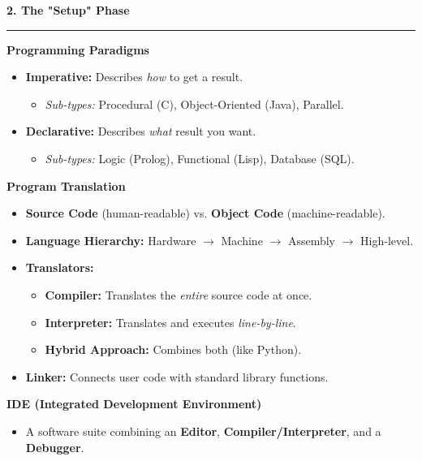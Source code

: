 \documentclass[a4paper, 8pt]{extarticle}
\newcommand{\sectionheading}[1]{\large\textbf{#1}\par\noindent\rule{\linewidth}{0.4pt}}
\newcommand{\subsectionheading}[1]{\normalsize\textbf{#1}}
\begin{document}
\begin{multicols}{2}
\vspace{1em}
\sectionheading{2. The "Setup" Phase}
\vspace{0.5em}
\subsectionheading{Programming Paradigms}
\begin{itemize}
    \item \textbf{Imperative:} Describes \textit{how} to get a result.
        \begin{itemize}
            \item \textit{Sub-types:} Procedural (C), Object-Oriented (Java), Parallel.
        \end{itemize}
    \item \textbf{Declarative:} Describes \textit{what} result you want.
        \begin{itemize}
            \item \textit{Sub-types:} Logic (Prolog), Functional (Lisp), Database (SQL).
        \end{itemize}
\end{itemize}

\subsectionheading{Program Translation}
\begin{itemize}
    \item \textbf{Source Code} (human-readable) vs. \textbf{Object Code} (machine-readable).
    \item \textbf{Language Hierarchy:} Hardware $\rightarrow$ Machine $\rightarrow$ Assembly $\rightarrow$ High-level.
    \item \textbf{Translators:}
    \begin{itemize}
        \item \textbf{Compiler:} Translates the \textit{entire} source code at once.
        \item \textbf{Interpreter:} Translates and executes \textit{line-by-line}.
        \item \textbf{Hybrid Approach:} Combines both (like Python).
    \end{itemize}
    \item \textbf{Linker:} Connects user code with standard library functions.
\end{itemize}

\subsectionheading{IDE (Integrated Development Environment)}
\begin{itemize}
    \item A software suite combining an \textbf{Editor}, \textbf{Compiler/Interpreter}, and a \textbf{Debugger}.
\end{itemize}

\columnbreak %


\end{multicols}
\end{document}
